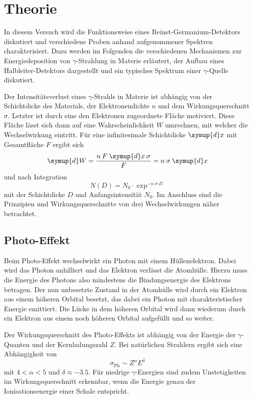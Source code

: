 \section{Theorie}
\label{sec:Theorie}

In diesem Versuch wird die Funktionsweise eines Reinst-Germanium-Detektors diskutiert
und verschiedene Proben anhand aufgenommener Spektren charakterisiert.
Dazu werden im Folgenden die verschiedenen Mechanismen zur Energiedeposition von
$\gamma$-Strahlung in Materie erläutert, der Aufbau eines Halbleiter-Detektors
dargestellt und ein typisches Spektrum einer $\gamma$-Quelle diskutiert.

Der Intensitätsverlust eines $\gamma$-Strahls in Materie ist abhängig von
der Schichtdicke des Materials, der Elektronendichte $n$ und dem
Wirkungsquerschnitt $\sigma$.
Letzter ist durch eine den Elektronen zugeordnete Fläche motiviert.
Diese Fläche lässt sich dann auf eine Wahrscheinlichkeit $W$ umrechnen,
mit welcher die Wechselwirkung eintritt. Für eine infinitesimale Schichtdicke
$\symup{d}x$ mit Gesamtfläche $F$ ergibt sich
\begin{equation*}
	\symup{d}W = \frac{n\:F\:\symup{d}x\:\sigma}{F} = n\:\sigma\:\symup{d}x
\end{equation*}
und nach Integration
\begin{equation}
	N\left(D\right) = N_\text{0} \cdot \exp^{-n\:\sigma\:D}
	\label{eqn:Intensitaet-Exp}
\end{equation}
mit der Schichtdicke $D$ und Anfangsintensität $N_\text{0}$.
Im Anschluss sind die Prinzipien und Wirkungsquerschnitte von drei
Wechselwirkungen näher betrachtet.

\subsection{Photo-Effekt}
\label{sec:Photo-Effekt}

Beim Photo-Effekt wechselwirkt ein Photon mit einem Hüllenelektron. Dabei
wird das Photon anhilliert und das Elektron verlässt die Atomhülle.
Hierzu muss die Energie des Photons also mindestens die Bindungsenergie des
Elektrons betragen.
Der nun unbesetzte Zustand in der Atomhülle wird durch ein Elektron aus
einem höheren Orbital besetzt, das dabei ein Photon mit charakteristischer
Energie emittiert. Die Lücke in dem höheren Orbital wird dann wiederum durch
ein Elektron aus einem noch höheren Orbital aufgefüllt und so weiter.

Der Wirkungsquerschnitt des Photo-Effekts ist abhängig von der Energie der
$\gamma$-Quanten und der Kernladungszahl $Z$.
Bei natürlichen Strahlern ergibt sich eine Abhängigkeit von
\begin{equation*}
	\sigma_\text{Ph} \sim Z^\alpha E^\delta
\end{equation*}
mit $4 < \alpha < 5$ und $\delta \approx \num{-3.5}$.
Für niedrige $\gamma$-Energien sind zudem Unstetigkeiten im Wirkungsquerschnitt
erkennbar, wenn die Energie genau der Ionisationsenergie einer Schale entspricht.

